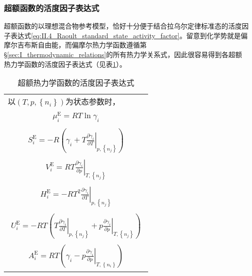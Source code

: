 \documentclass[main.tex]{subfiles}
\begin{document}
\subsubsection{超额函数的活度因子表达式}
超额函数的以理想混合物参考模型，恰好十分便于结合拉乌尔定律标准态的活度因子表达式\eqref{eq:II.4_Raoult_standard_state_activity_factor}。留意到化学势就是偏摩尔吉布斯自由能，而偏摩尔热力学函数遵循第\S\ref{sec:I_thermodynamic_relations}的所有热力学关系式，因此很容易得到各超额热力学函数的活度因子表达式（见表\ref{tab:excess_functions_activity_factor}）。
\begin{longtable}{m{}}
    \caption{超额热力学函数的活度因子表达式}\label{tab:excess_functions_activity_factor}                                                                                                                                      \\
    \hline
    以$\left(T,p,\left\{n_i\right\}\right)$为状态参数时，                                                                                                                                                              \\ [-4ex]


    \begin{align}    \mu_i^\text{E}  =RT\ln\gamma_i    \end{align}                                                                                                                                             \\ [-8ex]
    \begin{align}S_i^\text{E}    =-R\left(\gamma_i+T\left.\frac{\partial\gamma_i}{\partial T}\right|_{p,\left\{n_j\right\}}\right)\end{align}                                                                  \\[-8ex]
    \begin{align}V_i^\text{E}    =RT\left.\frac{\partial\gamma_i}{\partial p}\right|_{T,\left\{n_j\right\}}\end{align}                                                                                         \\[-8ex]
    \begin{align}H_i^\text{E}    =-RT^2\left.\frac{\partial\gamma_i}{\partial T}\right|_{p,\left\{n_j\right\}}\end{align}                                                                                      \\[-8ex]
    \begin{align}U_i^\text{E}    =-RT\left(T\left.\frac{\partial\gamma_i}{\partial T}\right|_{p,\left\{n_j\right\}}+p\left.\frac{\partial\gamma_i}{\partial p}\right|_{T,\left\{n_j\right\}}\right)\end{align} \\[-8ex]
    \begin{align}A_i^\text{E}    =RT\left(\gamma_i-p\left.\frac{\partial\gamma_i}{\partial p}\right|_{T,\left\{n_i\right\}}\right)\end{align}                                                                  \\
    \hline
\end{longtable}
\end{document}
